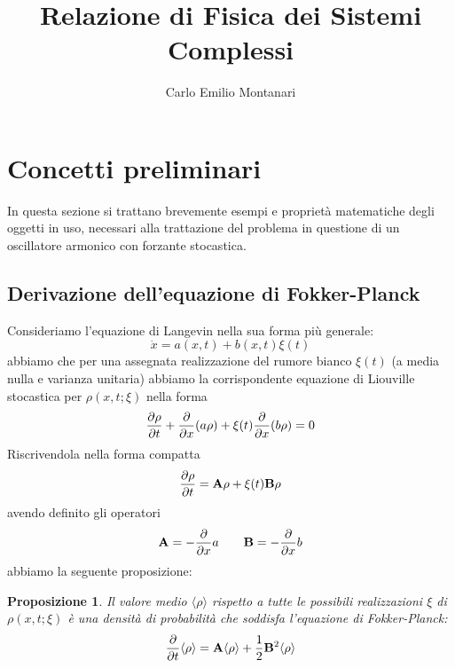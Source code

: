 \documentclass[10pt,a4paper]{article}
\title{Relazione di Fisica dei Sistemi Complessi}
\author{Carlo Emilio Montanari}
\newtheorem{prop}{Proposizione}[section]
\begin{document}
\maketitle

\tableofcontents

\section{Concetti preliminari}
In questa sezione si trattano brevemente esempi e proprietà matematiche degli oggetti in uso, necessari alla trattazione del problema in questione di un oscillatore armonico con forzante stocastica.

\subsection{Derivazione dell'equazione di Fokker-Planck}
Consideriamo l'equazione di Langevin nella sua forma più generale:
\begin{equation}
	\dot{x} = a(x,t) + b(x,t)\xi(t)
	\label{eq:stoc_base}
\end{equation}
abbiamo che per una assegnata realizzazione del rumore bianco \(\xi(t)\) (a media nulla e varianza unitaria) abbiamo la corrispondente equazione di Liouville stocastica per \(\rho(x,t;\xi)\) nella forma
\begin{equation}
	\pdv{\rho}{t} + \pdv{x}(a\rho) + \xi(t)\pdv{x}(b\rho)=0
\end{equation}
Riscrivendola nella forma compatta
\begin{equation}
	\pdv{\rho}{t} = \vb{A}\rho +\xi(t)\vb{B}\rho
\end{equation}
avendo definito gli operatori
\begin{equation}
	\vb{A} = -\pdv{}{x} a \quad\quad \vb{B} = - \pdv{}{x} b 
\end{equation}
abbiamo la seguente proposizione:
\begin{prop}
	Il valore medio \(\langle\rho\rangle\) rispetto a tutte le possibili realizzazioni \(\xi\) di \(\rho(x,t;\xi)\) è una densità di probabilità che soddisfa l'equazione di Fokker-Planck:
	\begin{equation}
		\pdv{}{t}\langle\rho\rangle = \vb{A}\langle\rho\rangle + \frac{1}{2}\vb{B}^2\langle\rho\rangle
	\end{equation}
\end{prop}
\end{document}
